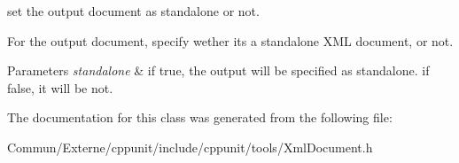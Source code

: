 set the output document as standalone or not. 

For the output document, specify wether it\textquotesingle{}s a standalone X\+ML document, or not.


\begin{DoxyParams}{Parameters}
{\em standalone} & if true, the output will be specified as standalone. if false, it will be not. \\
\hline
\end{DoxyParams}


The documentation for this class was generated from the following file\+:\begin{DoxyCompactItemize}
\item 
Commun/\+Externe/cppunit/include/cppunit/tools/Xml\+Document.\+h\end{DoxyCompactItemize}
